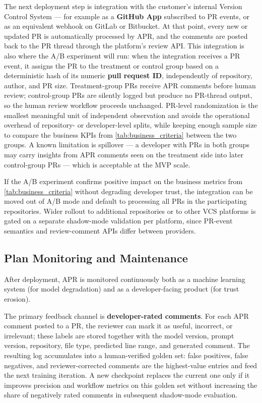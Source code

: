 \documentclass[11pt]{article}
\begin{document}
The next deployment step is integration with the customer's internal Version Control System --- for example as a \textbf{GitHub App} subscribed to PR events, or as an equivalent webhook on GitLab or Bitbucket. At that point, every new or updated PR is automatically processed by APR, and the comments are posted back to the PR thread through the platform's review API. This integration is also where the A/B experiment will run: when the integration receives a PR event, it assigns the PR to the treatment or control group based on a deterministic hash of its numeric \textbf{pull request ID}, independently of repository, author, and PR size. Treatment-group PRs receive APR comments before human review; control-group PRs are silently logged but produce no PR-thread output, so the human review workflow proceeds unchanged. PR-level randomization is the smallest meaningful unit of independent observation and avoids the operational overhead of repository- or developer-level splits, while keeping enough sample size to compare the business KPIs from \cref{tab:business_criteria} between the two groups. A known limitation is spillover --- a developer with PRs in both groups may carry insights from APR comments seen on the treatment side into later control-group PRs --- which is acceptable at the MVP scale.

If the A/B experiment confirms positive impact on the business metrics from \cref{tab:business_criteria} without degrading developer trust, the integration can be moved out of A/B mode and default to processing all PRs in the participating repositories. Wider rollout to additional repositories or to other VCS platforms is gated on a separate shadow-mode validation per platform, since PR-event semantics and review-comment APIs differ between providers.

\subsection*{Plan Monitoring and Maintenance}

After deployment, APR is monitored continuously both as a machine learning system (for model degradation) and as a developer-facing product (for trust erosion).

The primary feedback channel is \textbf{developer-rated comments}. For each APR comment posted to a PR, the reviewer can mark it as useful, incorrect, or irrelevant; these labels are stored together with the model version, prompt version, repository, file type, predicted line range, and generated comment. The resulting log accumulates into a human-verified golden set: false positives, false negatives, and reviewer-corrected comments are the highest-value entries and feed the next training iteration. A new checkpoint replaces the current one only if it improves precision and workflow metrics on this golden set without increasing the share of negatively rated comments in subsequent shadow-mode evaluation.
\end{document}
